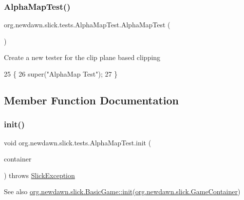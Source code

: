 \subsubsection{\texorpdfstring{Alpha\+Map\+Test()}{AlphaMapTest()}}
{\footnotesize\ttfamily org.\+newdawn.\+slick.\+tests.\+Alpha\+Map\+Test.\+Alpha\+Map\+Test (\begin{DoxyParamCaption}{ }\end{DoxyParamCaption})\hspace{0.3cm}{\ttfamily [inline]}}

Create a new tester for the clip plane based clipping 
\begin{DoxyCode}
25                           \{
26         super(\textcolor{stringliteral}{"AlphaMap Test"});
27     \}
\end{DoxyCode}


\subsection{Member Function Documentation}
\mbox{\label{classorg_1_1newdawn_1_1slick_1_1tests_1_1_alpha_map_test_a4daa13d1f96a2f22faa66cd033a44894}} 
\subsubsection{\texorpdfstring{init()}{init()}}
{\footnotesize\ttfamily void org.\+newdawn.\+slick.\+tests.\+Alpha\+Map\+Test.\+init (\begin{DoxyParamCaption}\item[{\mbox{\hyperlink{classorg_1_1newdawn_1_1slick_1_1_game_container}{Game\+Container}}}]{container }\end{DoxyParamCaption}) throws \mbox{\hyperlink{classorg_1_1newdawn_1_1slick_1_1_slick_exception}{Slick\+Exception}}\hspace{0.3cm}{\ttfamily [inline]}}

\begin{DoxySeeAlso}{See also}
\mbox{\hyperlink{classorg_1_1newdawn_1_1slick_1_1_basic_game_a8af0900217e4d389249f71367b22d114}{org.\+newdawn.\+slick.\+Basic\+Game\+::init}}(\mbox{\hyperlink{classorg_1_1newdawn_1_1slick_1_1_game_container}{org.\+newdawn.\+slick.\+Game\+Container}}) 
\end{DoxySeeAlso}


